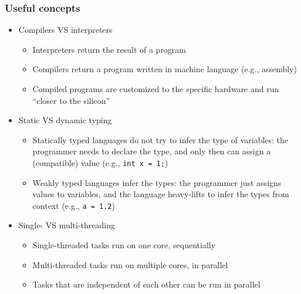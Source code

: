 \documentclass[10pt, aspectratio=1610]{beamer}
\begin{document}
\begin{frame}
  \frametitle{Useful concepts}

  \small
  \begin{itemize}
    \item Compilers VS interpreters
      \begin{itemize}
        \item Interpreters return the result of a program
        \item Compilers return a program written in machine language (e.g., assembly)
        \item Compiled programs are customized to the specific hardware and run ``closer to the silicon''
      \end{itemize}
    \item Static VS dynamic typing
      \begin{itemize}
        \item Statically typed languages do not try to infer the type of variables: the programmer needs to declare the type, and only then can assign a (compatible) value (e.g., \texttt{int x = 1;})
        \item Weakly typed languages infer the types: the programmer just assigns values to variables, and the language heavy-lifts to infer the types from context (e.g., \texttt{a = 1.2})
      \end{itemize}
    \item Single- VS multi-threading
      \begin{itemize}
        \item Single-threaded tasks run on one core, sequentially
        \item Multi-threaded tasks run on multiple cores, in parallel
        \item Tasks that are independent of each other can be run in parallel
      \end{itemize}
  \end{itemize}

\end{frame}
\end{document}
